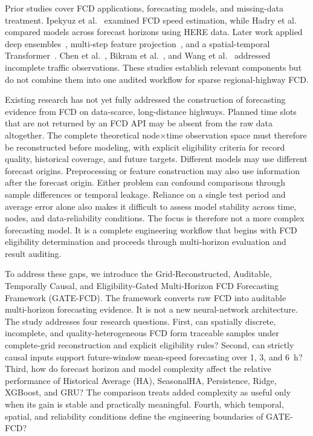 \documentclass[pdflatex,sn-mathphys-num,iicol]{sn-jnl}
\begin{document}
Prior studies cover FCD applications, forecasting models, and missing-data treatment. Ipekyuz et al.~\cite{Ipekyuz2025FCD} examined FCD speed estimation, while Hadry et al.~\cite{Hadry2025TrafficForecasting} compared models across forecast horizons using HERE data. Later work applied deep ensembles~\cite{Cini2024DeepEnsemble}, multi-step feature projection~\cite{Zeb2024FeatureProjection}, and a spatial-temporal Transformer~\cite{Liu2024SpatialTemporalTransformer}. Chen et al.~\cite{Chen2024TrafficCompletion}, Bikram et al.~\cite{Bikram2024Imputation}, and Wang et al.~\cite{Wang2024RoadNetworkPixelization} addressed incomplete traffic observations. These studies establish relevant components but do not combine them into one audited workflow for sparse regional-highway FCD.

Existing research has not yet fully addressed the construction of forecasting evidence from FCD on data-scarce, long-distance highways. Planned time slots that are not returned by an FCD API may be absent from the raw data altogether. The complete theoretical node$\times$time observation space must therefore be reconstructed before modeling, with explicit eligibility criteria for record quality, historical coverage, and future targets. Different models may use different forecast origins. Preprocessing or feature construction may also use information after the forecast origin. Either problem can confound comparisons through sample differences or temporal leakage. Reliance on a single test period and average error alone also makes it difficult to assess model stability across time, nodes, and data-reliability conditions. The focus is therefore not a more complex forecasting model. It is a complete engineering workflow that begins with FCD eligibility determination and proceeds through multi-horizon evaluation and result auditing.

To address these gaps, we introduce the Grid-Reconstructed, Auditable, Temporally Causal, and Eligibility-Gated Multi-Horizon FCD Forecasting Framework (GATE-FCD). The framework converts raw FCD into auditable multi-horizon forecasting evidence. It is not a new neural-network architecture. The study addresses four research questions. First, can spatially discrete, incomplete, and quality-heterogeneous FCD form traceable samples under complete-grid reconstruction and explicit eligibility rules? Second, can strictly causal inputs support future-window mean-speed forecasting over 1, 3, and 6~h? Third, how do forecast horizon and model complexity affect the relative performance of Historical Average (HA), SeasonalHA, Persistence, Ridge, XGBoost, and GRU? The comparison treats added complexity as useful only when its gain is stable and practically meaningful. Fourth, which temporal, spatial, and reliability conditions define the engineering boundaries of GATE-FCD?
\end{document}
